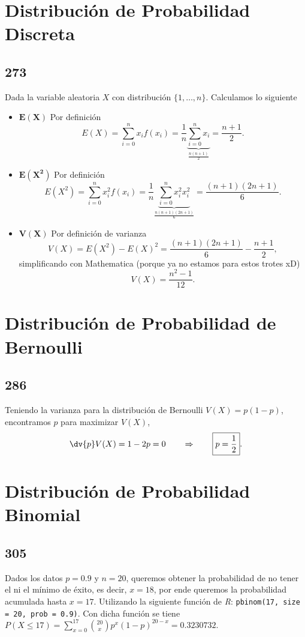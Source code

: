 \section{Distribución de Probabilidad Discreta}
\subsection*{273}
Dada la variable aleatoria $X$ con distribución $\{ 1,\ldots ,n \}$. Calculamos lo siguiente
\begin{itemize}
	\item $\mathbf{E(X)}$ Por definición
		$$E(X) = \sum _{i=0} ^n x_i f(x_i) = \frac{1}{n} \underbrace{\sum _{i=0} ^n x_i}_{\frac{n(n+1)}{2}} = \frac{n+1}{2}.$$
	\item $\mathbf{E(X^2)}$ Por definición
		$$E(X^2) = \sum _{i=0} ^n x_i ^2 f(x_i) = \frac{1}{n} \underbrace{\sum _{i=0} ^n x_i ^2 x_i ^2}_{\frac{n(n+1)(2n+1)}{6}} = \frac{(n+1)(2n+1)}{6} .$$
	\item $\mathbf{V(X)}$ Por definición de varianza
		$$V(X) = E(X^2) - E(X)^2 = \frac{(n+1)(2n+1)}{6} - \frac{n+1}{2},$$
	simplificando con Mathematica (porque ya no estamos para estos trotes xD)
		$$V(X) = \frac{n^2 - 1}{12} .$$
\end{itemize}

\section{Distribución de Probabilidad de Bernoulli}
\subsection*{286}
Teniendo la varianza para la distribución de Bernoulli $V(X) = p(1-p)$, encontramos $p$ para maximizar $V(X)$,
	$$\dv{p} V(X) = 1-2p = 0 \quad \quad \Rightarrow \quad \quad \boxed{p=\frac{1}{2}}.$$
\section{Distribución de Probabilidad Binomial}
\subsection*{305}
Dados los datos $p = 0.9$ y $n = 20$, queremos obtener la probabilidad de no tener el ni el mínimo de éxito, es decir, $x = 18$, por ende queremos la probabilidad acumulada hasta $x = 17$. Utilizando la siguiente función de \textit{R}: \texttt{pbinom(17, size = 20, prob = 0.9)}. Con dicha función se tiene $P(X\leq 17) = \displaystyle\sum _{x=0} ^{17} \binom{20}{x} p^x (1-p)^{20-x} = 0.3230732.$



